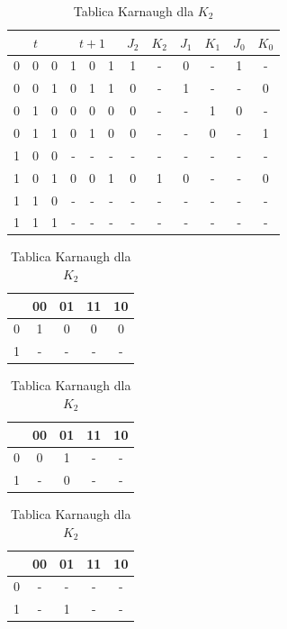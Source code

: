 \documentclass[12pt,a4paper]{article}
\begin{document}
			\begin{table}[!ht]
			
				\caption{Tabela Prawdy}
				\vspace{0.2cm}
				\centering
				\begin{tabular}{ccc|ccc|cc|cc|cc}
					\multicolumn{3}{c|}{$t$}&\multicolumn{3}{c|}{$t+1$}&$J_2$&$K_2$&$J_1$&$K_1$&$J_0$&$K_0$\\\hline
					0&0&0 &1&0&1 &1&- &0&- &1&-\\
					0&0&1 &0&1&1 &0&- &1&- &-&0\\
					0&1&0 &0&0&0 &0&- &-&1 &0&-\\
					0&1&1 &0&1&0 &0&- &-&0 &-&1\\\hline
					1&0&0 &-&-&- &-&- &-&- &-&-\\
					1&0&1 &0&0&1 &0&1 &0&- &-&0\\
					1&1&0 &-&-&- &-&- &-&- &-&-\\
					1&1&1 &-&-&- &-&- &-&- &-&-\\
				\end{tabular}
				\vspace{1cm}
				
				\begin{minipage}{.5\textwidth}
					\caption{Tablica Karnaugh dla $J_2$}
					\vspace{0.2cm}
					\centering
					\begin{tabular}{c|c|c|c|c}
						\backslashbox{$Q_2$}{$Q_1Q_0$}&00&01&11&10\\\hline
						0&	1&0&0&0\\\hline
						1&	-&-&-&-\\
					\end{tabular}
					
					\vspace{0.4cm}
					
					\caption{Tablica Karnaugh dla $J_1$}
					\vspace{0.2cm}
					\centering
					\begin{tabular}{c|c|c|c|c}
						\backslashbox{$Q_2$}{$Q_1Q_0$}&00&01&11&10\\\hline
						0&	0&1&-&-\\\hline
						1&	-&0&-&-\\
					\end{tabular}
				\end{minipage}%
				\begin{minipage}{.5\textwidth}
				 	\caption{Tablica Karnaugh dla $K_2$}
				 	\vspace{0.2cm}
				 	\centering
				 	\begin{tabular}{c|c|c|c|c}
				 		\backslashbox{$Q_2$}{$Q_1Q_0$}&00&01&11&10\\\hline
				 		0&	-&-&-&-\\\hline
				 		1&	-&1&-&-\\
				 	\end{tabular} 
				 	

\end{minipage}
\end{table}
\end{document}
